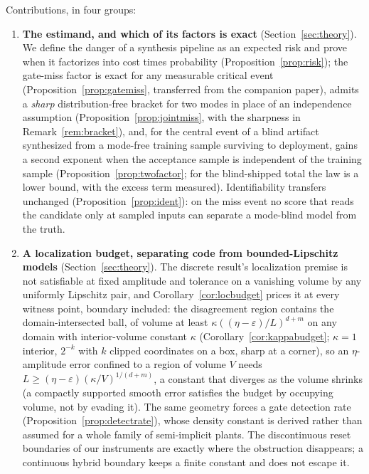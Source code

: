 \documentclass[11pt]{article}
\theoremstyle{definition}
\theoremstyle{remark}
\begin{document}
Contributions, in four groups:
\begin{enumerate}
\item \textbf{The estimand, and which of its factors is exact} (Section~\ref{sec:theory}). We define the danger of a synthesis pipeline as an expected risk and prove when it factorizes into cost times probability (Proposition~\ref{prop:risk}); the gate-miss factor is exact for any measurable critical event (Proposition~\ref{prop:gatemiss}, transferred from the companion paper), admits a \emph{sharp} distribution-free bracket for two modes in place of an independence assumption (Proposition~\ref{prop:jointmiss}, with the sharpness in Remark~\ref{rem:bracket}), and, for the central event of a blind artifact synthesized from a mode-free training sample surviving to deployment, gains a second exponent when the acceptance sample is independent of the training sample (Proposition~\ref{prop:twofactor}; for the blind-shipped total the law is a lower bound, with the excess term measured). Identifiability transfers unchanged (Proposition~\ref{prop:ident}): on the miss event no score that reads the candidate only at sampled inputs can separate a mode-blind model from the truth.
\item \textbf{A localization budget, separating code from bounded-Lipschitz models} (Section~\ref{sec:theory}). The discrete result's localization premise is not satisfiable at fixed amplitude and tolerance on a vanishing volume by any uniformly Lipschitz pair, and Corollary~\ref{cor:locbudget} prices it at every witness point, boundary included: the disagreement region contains the domain-intersected ball, of volume at least $\kappa((\eta-\varepsilon)/L)^{d+m}$ on any domain with interior-volume constant $\kappa$ (Corollary~\ref{cor:kappabudget}; $\kappa = 1$ interior, $2^{-k}$ with $k$ clipped coordinates on a box, sharp at a corner), so an $\eta$-amplitude error confined to a region of volume $V$ needs $L \geq (\eta-\varepsilon)(\kappa/V)^{1/(d+m)}$, a constant that diverges as the volume shrinks (a compactly supported smooth error satisfies the budget by occupying volume, not by evading it). The same geometry forces a gate detection rate (Proposition~\ref{prop:detectrate}), whose density constant is derived rather than assumed for a whole family of semi-implicit plants. The discontinuous reset boundaries of our instruments are exactly where the obstruction disappears; a continuous hybrid boundary keeps a finite constant and does not escape it.

\end{enumerate}
\end{document}
